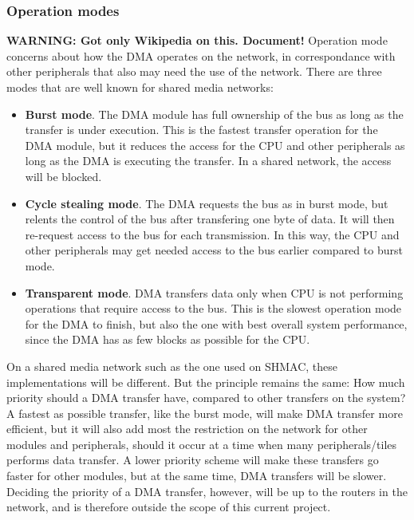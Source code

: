 \subsubsection{Operation modes}
\textbf{WARNING: Got only Wikipedia on this. Document!}
Operation mode concerns about how the DMA operates on the network, in correspondance with other peripherals that also may need the use of the network.
There are three modes that are well known for shared media networks:
\begin{itemize}
    \item \textbf{Burst mode}.
    The DMA module has full ownership of the bus as long as the transfer is under execution.
    This is the fastest transfer operation for the DMA module, but it reduces the access for the CPU and other peripherals as long as the DMA is executing the transfer.
    In a shared network, the access will be blocked.
    \item \textbf{Cycle stealing mode}.
    The DMA requests the bus as in burst mode, but relents the control of the bus after transfering one byte of data.
    It will then re-request access to the bus for each transmission.
    In this way, the CPU and other peripherals may get needed access to the bus earlier compared to burst mode. 
    \item \textbf{Transparent mode}.
    DMA transfers data only when CPU is not performing operations that require access to the bus.
    This is the slowest operation mode for the DMA to finish, but also the one with best overall system performance, since the DMA has as few blocks as possible for the CPU. 
\end{itemize}
On a shared media network such as the one used on SHMAC, these implementations will be different.
But the principle remains the same: How much priority should a DMA transfer have, compared to other transfers on the system?
A fastest as possible transfer, like the burst mode, will make DMA transfer more efficient, but it will also add most the restriction on the network for other modules and peripherals, should it occur at a time when many peripherals/tiles performs data transfer.
A lower priority scheme will make these transfers go faster for other modules, but at the same time, DMA transfers will be slower.
Deciding the priority of a DMA transfer, however, will be up to the routers in the network, and is therefore outside the scope of this current project.

